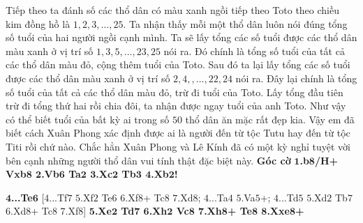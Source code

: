 \begin{multicols}{2}
	Tiếp theo ta đánh số các thổ dân có màu xanh ngồi tiếp theo Toto theo chiều kim đồng hồ là $1, 2, 3,\ldots, 25$. 
	\vskip 0.1cm
	Ta nhận thấy mỗi một thổ dân luôn nói đúng tổng số tuổi của hai người ngồi cạnh mình. Ta sẽ lấy tổng các số tuổi được các thổ dân màu xanh ở vị trí số $1, 3, 5,\ldots, 23, 25$ nói ra. Đó chính là tổng số tuổi của tất cả các thổ dân màu  đỏ, cộng thêm tuổi của Toto. Sau đó ta lại lấy tổng các số tuổi được các thổ dân màu xanh ở vị trí số $2, 4, ,\ldots, 22, 24$ nói ra. Đây lại chính là tổng số tuổi của tất cả các thổ dân màu  đỏ, trừ đi tuổi của Toto. Lấy tổng đầu tiên trừ đi tổng thứ hai rồi chia đôi, ta nhận được ngay tuổi của anh Toto. Như vậy có thể biết tuổi của bất kỳ ai trong số $50$ thổ dân ăn mặc rất đẹp kia.
	\vskip 0.1cm
	Vậy em đã biết cách Xuân Phong xác định được ai là người đến từ tộc Tutu hay đến từ tộc Titi rồi chứ nào. Chắc hẳn Xuân Phong và Lê Kính đã có một kỳ nghỉ tuyệt vời bên cạnh những người thổ dân vui tính thật đặc biệt này.
	\vskip 0.1cm
	\textbf{\color{toancuabi}Góc cờ}
	\vskip 0.1cm
	\textbf{\color{toancuabi}$\pmb{1}$.b$\pmb{8}$/H+ Vxb$\pmb{8}$ $\pmb{2}$.Vb$\pmb{6}$ Ta$\pmb{2}$ $\pmb{3}$.Xc$\pmb{2}$ Tb$\pmb{3}$ $\pmb{4}$.Xb$\pmb{2}$!}
	\begin{center}
		\newgame
		\scalebox{0.85}\showboard
	\end{center}
	\textbf{\color{toancuabi}$\pmb{4}$...Te$\pmb{6}$} [$4$...Tf$7$ $5$.Xf$2$ Te$6$ $6$.Xf$8$+ Tc$8$ $7$.Xd$8$; $4$...Ta$4$ $5$.Va$5$+; $4$...Td$5$ $5$.Xd$2$ Tb$7$ $6$.Xd$8$+ Tc$8$ $7$.Xf$8$]
	\vskip 0.1cm
	\textbf{\color{toancuabi}$\pmb{5}$.Xe$\pmb{2}$ Td$\pmb{7}$ $\pmb{6}$.Xh$\pmb{2}$ Vc$\pmb{8}$ $\pmb{7}$.Xh$\pmb{8}$+ Te$\pmb{8}$ $\pmb{8}$.Xxe$\pmb{8}$+}
\end{multicols}